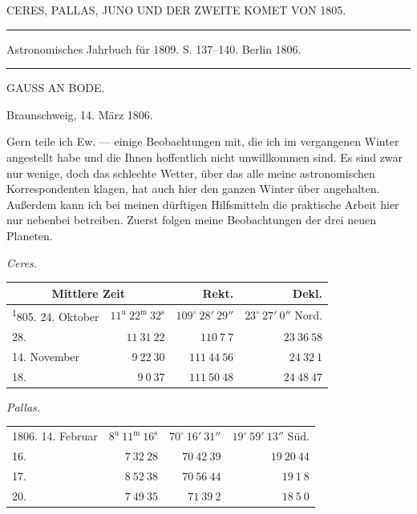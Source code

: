 \clearpage
{}
\begin{center}
CERES, PALLAS, JUNO UND DER ZWEITE KOMET VON 1805.
\end{center}

\noindent\rule{\linewidth}{0.4pt}
\begin{center}
Astronomisches Jahrbuch für 1809. S. 137–140. Berlin 1806.
\end{center}
\noindent\rule{\linewidth}{0.4pt}

\begin{center}
GAUSS AN BODE.
\end{center}
\hfill Braunschweig, 14. März 1806.

\par\indent Gern teile ich Ew. --- einige Beobachtungen mit, die ich im vergangenen Winter angestellt habe und die Ihnen hoffentlich nicht unwillkommen sind. Es sind zwar nur wenige, doch das schlechte Wetter, über das alle meine astronomischen Korrespondenten klagen, hat auch hier den ganzen Winter über angehalten. Außerdem kann ich bei meinen dürftigen Hilfsmitteln die praktische Arbeit hier nur nebenbei betreiben. Zuerst folgen meine Beobachtungen der drei neuen Planeten.

\begin{center}\emph{Ceres.}\end{center}
\begin{center}
\begingroup\fontsize{9}{11}\selectfont\setlength{\tabcolsep}{2pt}\renewcommand{\arraystretch}{1.1}
\begin{tabular}{lr|r|r}
\multicolumn{2}{c|}{Mittlere Zeit} & Rekt. & Dekl.\\ \hline
\textsuperscript{1}805. 24. Oktober & $11^{\mathrm u}\ 22^{\mathrm m}\ 32^{\mathrm s}$ & $109^\circ\ 28'\ 29''$ & $23^\circ\ 27'\ 0''$ Nord.\\
28. & $11\ 31\ 22$ & $110\ 7\ 7$ & $23\ 36\ 58$\\
14. November & $9\ 22\ 30$ & $111\ 44\ 56$ & $24\ 32\ 1$\\
18. & $9\ 0\ 37$ & $111\ 50\ 48$ & $24\ 48\ 47$\\
\end{tabular}\endgroup
\end{center}

\begin{center}\emph{Pallas.}\end{center}
\begin{center}
\begingroup\fontsize{9}{11}\selectfont\setlength{\tabcolsep}{2pt}\renewcommand{\arraystretch}{1.1}
\begin{tabular}{lr|r|r}
1806. 14. Februar & $8^{\mathrm u}\ 11^{\mathrm m}\ 16^{\mathrm s}$ & $70^\circ\ 16'\ 31''$ & $19^\circ\ 59'\ 13''$ Süd.\\
16. & $7\ 32\ 28$ & $70\ 42\ 39$ & $19\ 20\ 44$\\
17. & $8\ 52\ 38$ & $70\ 56\ 44$ & $19\ 1\ 8$\\
20. & $7\ 49\ 35$ & $71\ 39\ 2$ & $18\ 5\ 0$\\
\end{tabular}\endgroup
\end{center}


